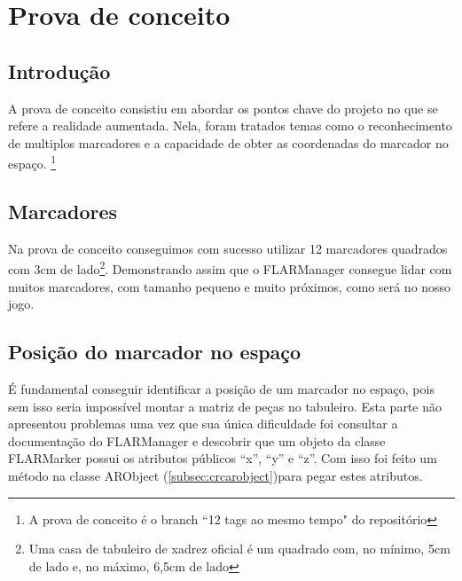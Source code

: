 \documentclass[a4paper,12pt]{book}
\begin{document}
	\chapter{Prova de conceito}
	\label{ch:provadeconceito}
		\section{Introdu\c c\~ao}
		\label{sec:pcintroducao}
		A prova de conceito consistiu em abordar os pontos chave do projeto no que se
		refere a realidade aumentada. Nela, foram tratados temas como o reconhecimento
		de multiplos marcadores e a capacidade de obter as coordenadas do marcador no
		espa\c co. \footnote{A prova de conceito \'e o branch ``12 tags ao mesmo
		tempo" do reposit\'orio}
		
		\section{Marcadores}
		\label{sec:pcmarcadores}
		Na prova de conceito conseguimos com sucesso utilizar 12 marcadores quadrados
		com 3cm de lado\footnote{Uma casa de tabuleiro de xadrez oficial \'e um
		quadrado com, no m\'inimo, 5cm de lado e, no m\'aximo, 6,5cm de lado}. Demonstrando assim que
		o FLARManager consegue lidar com muitos marcadores, com tamanho pequeno e muito pr\'oximos, como ser\'a no
		nosso jogo.
		
		\section{Posi\c c\~ao do marcador no espa\c co}
		\label{sec:pcposicaodomarcadornoespaco}
		\'E fundamental conseguir identificar a posi\c c\~ao de um marcador no espa\c
		co, pois sem isso seria imposs\'ivel montar a matriz de pe\c cas no tabuleiro.
		Esta parte n\~ao apresentou problemas uma vez que sua \'unica dificuldade foi
		consultar a documenta\c c\~ao do FLARManager e descobrir que um objeto da
		classe FLARMarker possui os atributos p\'ublicos ``x'', ``y'' e ``z''. Com
		isso foi feito um m\'etodo na classe ARObject
		(\ref{subsec:crcarobject})para pegar estes atributos.
		
\end{document}
